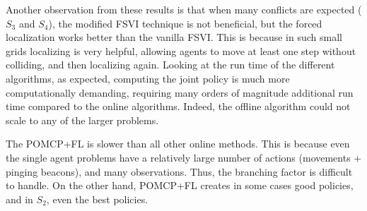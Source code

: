 \documentclass[letterpaper]{article}
\begin{document}
Another observation from these results is that when many conflicts are expected ($S_3$ and $S_4$), the modified FSVI technique is not beneficial, but the forced localization works better than the vanilla FSVI.
This is because in such small grids localizing is very helpful, allowing agents to move at least one step without colliding, and then localizing again.
Looking at the run time of the different algorithms, as expected, computing the joint policy is much more computationally demanding, requiring many orders of magnitude additional run time compared to the online algorithms. Indeed, the offline algorithm could not scale to any of the larger problems.

The POMCP+FL is slower than all other online methods. This is because even the single agent problems have a relatively large number of actions (movements + pinging beacons), and many observations. Thus, the branching factor is difficult to handle. On the other hand, POMCP+FL creates in some cases good policies, and in $S_2$, even the best policies.
\end{document}
